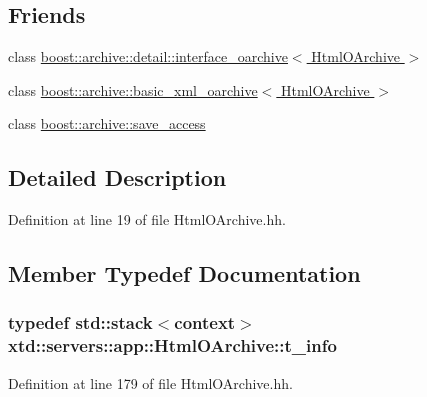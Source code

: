 \subsection*{Friends}
\begin{DoxyCompactItemize}
\item 
class \hyperlink{classxtd_1_1servers_1_1app_1_1HtmlOArchive_a725f48824bde766dcd0e8049b4df3df0}{boost\+::archive\+::detail\+::interface\+\_\+oarchive$<$ Html\+O\+Archive $>$}
\item 
class \hyperlink{classxtd_1_1servers_1_1app_1_1HtmlOArchive_a350c2afaed5c679f01f1b4e36a6ad91f}{boost\+::archive\+::basic\+\_\+xml\+\_\+oarchive$<$ Html\+O\+Archive $>$}
\item 
class \hyperlink{classxtd_1_1servers_1_1app_1_1HtmlOArchive_aaca003bb8a4fc59424e4025130da4edd}{boost\+::archive\+::save\+\_\+access}
\end{DoxyCompactItemize}


\subsection{Detailed Description}


Definition at line 19 of file Html\+O\+Archive.\+hh.



\subsection{Member Typedef Documentation}
\subsubsection[{\texorpdfstring{t\+\_\+info}{t_info}}]{\setlength{\rightskip}{0pt plus 5cm}typedef std\+::stack$<$context$>$ {\bf xtd\+::servers\+::app\+::\+Html\+O\+Archive\+::t\+\_\+info}}\hypertarget{classxtd_1_1servers_1_1app_1_1HtmlOArchive_aedb461454d0c255709664fcccc379cf5}{}\label{classxtd_1_1servers_1_1app_1_1HtmlOArchive_aedb461454d0c255709664fcccc379cf5}


Definition at line 179 of file Html\+O\+Archive.\+hh.

